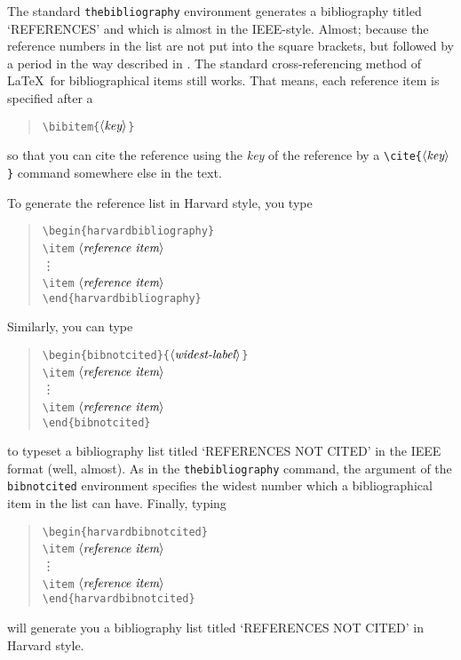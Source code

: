 \documentclass[12pt]{article}
\newcommand{\bq}{\begin{quotation}\noindent}
\newcommand{\eq}{\end{quotation}}
\renewcommand{\arg}[1]{$\langle\mbox{\it #1}\rangle$}
\begin{document}
The standard {\tt thebibliography} environment generates a
bibliography titled `REFERENCES' and which is almost in the
IEEE-style. Almost; because the reference numbers in the list are not
put into the square brackets, but followed by a period in the way
described in \cite{fbeman}. The standard cross-referencing method of
\LaTeX\ for bibliographical items still works. That means, each
reference item is specified after a
\bq
\verb/\bibitem{/\arg{key}\verb/}/
\eq
so that you can cite the reference using the {\em key\/} of the
reference by a \verb/\cite{/\arg{key}\verb/}/ command somewhere else
in the text.

To generate the reference list in Harvard style, you type
\bq
\verb/\begin{harvardbibliography}/ \\
\verb/\item/ $\langle\mbox{\it reference item}\rangle$\\
\verb//\vdots \\
\verb/\item/ $\langle\mbox{\it reference item}\rangle$\\
\verb/\end{harvardbibliography}/
\eq
Similarly, you can type
\bq
\verb/\begin{bibnotcited}{/\arg{widest-label}\verb/}/ \\
\verb/\item/ $\langle\mbox{\it reference item}\rangle$\\
\verb//\vdots \\
\verb/\item/ $\langle\mbox{\it reference item}\rangle$\\
\verb/\end{bibnotcited}/
\eq
to typeset a bibliography list titled `REFERENCES NOT CITED' in the
IEEE format (well, almost).  As in the {\tt thebibliography} command,
the argument of the {\tt bibnotcited} environment specifies the widest
number which a bibliographical item in the list can have. Finally,
typing
\bq
\verb/\begin{harvardbibnotcited}/ \\
\verb/\item/ $\langle\mbox{\it reference item}\rangle$\\
\verb//\vdots \\
\verb/\item/ $\langle\mbox{\it reference item}\rangle$\\
\verb/\end{harvardbibnotcited}/
\eq
will generate you a bibliography list titled `REFERENCES NOT CITED' in
Harvard style.
\end{document}
